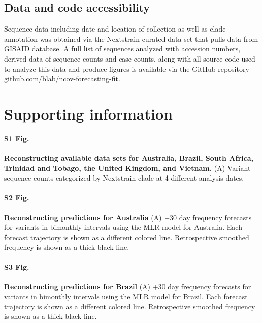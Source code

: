\documentclass[10pt,letterpaper]{article}
\begin{document}
\subsection*{Data and code accessibility}

Sequence data including date and location of collection as well as clade annotation was obtained via the Nextstrain-curated data set that pulls data from GISAID database.
A full list of sequences analyzed with accession numbers, derived data of sequence counts and case counts, along with all source code used to analyze this data and produce figures is available via the GitHub repository \href{https://github.com/blab/ncov-forecasting-fit}{github.com/blab/ncov-forecasting-fit}.


\section*{Supporting information}

\paragraph*{S1 Fig.}
\label{fig:S1}
{\bf Reconstructing available data sets for Australia, Brazil, South Africa, Trinidad and Tobago, the United Kingdom, and Vietnam.}
(A) Variant sequence counts categorized by Nextstrain clade at 4 different analysis dates.

\paragraph*{S2 Fig.}
\label{fig:S2}
{\bf Reconstructing predictions for Australia}
(A) +30 day frequency forecasts for variants in bimonthly intervals using the MLR model for Australia.
		Each forecast trajectory is shown as a different colored line.
		Retrospective smoothed frequency is shown as a thick black line.

\paragraph*{S3 Fig.}
\label{fig:S3}
{\bf Reconstructing predictions for Brazil}
(A) +30 day frequency forecasts for variants in bimonthly intervals using the MLR model for Brazil.
		Each forecast trajectory is shown as a different colored line.
		Retrospective smoothed frequency is shown as a thick black line.
\end{document}
